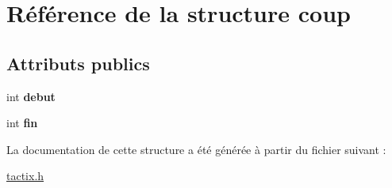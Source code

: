 \hypertarget{structcoup}{\section{Référence de la structure coup}
\label{structcoup}
}
\subsection*{Attributs publics}
\begin{DoxyCompactItemize}
\item 
\hypertarget{structcoup_ad3c3437c5071d7b48c81645decaaeb50}{int {\bfseries debut}}\label{structcoup_ad3c3437c5071d7b48c81645decaaeb50}

\item 
\hypertarget{structcoup_a6f978760530491aaf5d14707ebab51ac}{int {\bfseries fin}}\label{structcoup_a6f978760530491aaf5d14707ebab51ac}

\end{DoxyCompactItemize}


La documentation de cette structure a été générée à partir du fichier suivant \-:\begin{DoxyCompactItemize}
\item 
\hyperlink{tactix_8h}{tactix.\-h}\end{DoxyCompactItemize}
